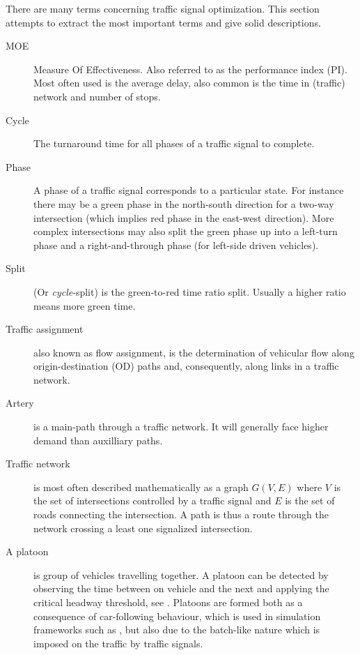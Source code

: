 \label{vocabulary}
There are many terms concerning traffic signal optimization. This section attempts to extract the most important terms and give solid descriptions.


\begin{description}

	\item[MOE] Measure Of Effectiveness. Also referred to as the performance index (PI).
	Most often used is the average delay, also common is the time in (traffic) network and number of stops. 
			
	\item[Cycle] The turnaround time for all phases of a traffic signal to complete.
	
	\item[Phase] A phase of a traffic signal corresponds to a particular state. 
	For instance there may be a green phase in the north-south direction for a two-way intersection (which implies red phase in the east-west direction).
	More complex intersections may also split the green phase up into a left-turn phase and a right-and-through phase (for left-side driven vehicles).
	
	\item[Split] (Or \textit{cycle}-split) is the green-to-red time ratio split. Usually a higher ratio means more green time.
	
	\item[Traffic assignment] also known as flow assignment, is the determination of vehicular flow along origin-destination (OD) paths and, consequently, along links in a traffic network. 

\item[Artery] is a main-path through a traffic network. It will generally face higher demand than auxilliary paths.

\item[Traffic network] is most often described mathematically as a graph $G(V,E)$ where $V$ is the set of intersections controlled by a traffic signal and $E$ is the set of roads connecting the intersection. A path is thus a route through the network crossing a least one signalized intersection.

	\item[A platoon] is group of vehicles travelling together. A platoon can be detected by observing the time between on vehicle and the next and applying the critical headway threshold, see \cite[sct. 2]{25}. 
Platoons are formed both as a consequence of car-following behaviour, which is used in simulation frameworks such as \cite{treiber-2000-62}, but also due to the batch-like nature which is imposed on the traffic by traffic signals.


\end{description}
